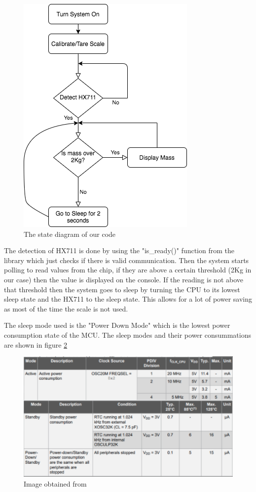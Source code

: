 \documentclass[letterpaper,11pt]{article}
\newcommand{\myLink}[2]{\href{#1}{\color{blue}\underline{\smash{\texttt{#2}}}}}
\begin{document}
\begin{figure}[h]
  \centering
  \includegraphics[scale=.7]{Flow}
  \caption{The state diagram of our code}
  \label{img:stateflow}
\end{figure}

The detection of HX711 is done by using the "is\_ready()" function from the
library which just checks if there is valid communication. Then the system
starts polling to read values from the chip, if they are above a certain
threshold (2Kg in our case) then the value is displayed on the console. If the
reading is not above that threshold then the system goes to sleep by turning the
CPU to its lowest sleep state and the HX711 to the sleep state. This allows for
a lot of power saving as most of the time the scale is not used.

The sleep mode used is the "Power Down Mode" which is the lowest power
consumption state of the MCU. The sleep modes and their power consummations are
shown in figure \ref{img:sleep}

\begin{figure}[h]
  \centering
  \includegraphics[width=1.0\textwidth]{powermodes}
  \caption{Image obtained from \myLink{http://ww1.microchip.com/downloads/en/DeviceDoc/ATmega4808-4809-Data-Sheet-DS40002173A.pdf}{ATMEGA 4809 Datasheet}}
  \label{img:sleep}
\end{figure}
\end{document}
